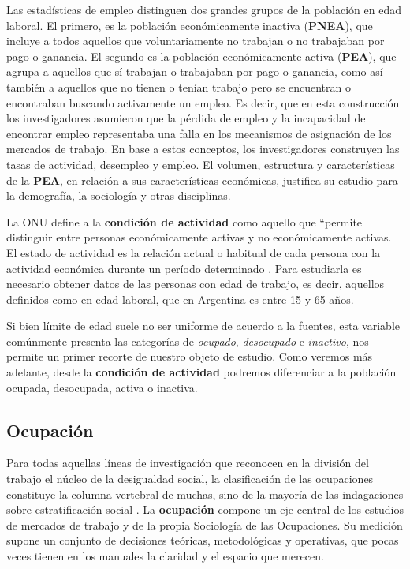 \documentclass[
]{book}
\begin{document}
Las estadísticas de empleo distinguen dos grandes grupos de la población en edad laboral. El primero, es la población económicamente inactiva (\textbf{PNEA}), que incluye a todos aquellos que voluntariamente no trabajan o no trabajaban por pago o ganancia. El segundo es la población económicamente activa (\textbf{PEA}), que agrupa a aquellos que sí trabajan o trabajaban por pago o ganancia, como así también a aquellos que no tienen o tenían trabajo pero se encuentran o encontraban buscando activamente un empleo. Es decir, que en esta construcción los investigadores asumieron que la pérdida de empleo y la incapacidad de encontrar empleo representaba una falla en los mecanismos de asignación de los mercados de trabajo. En base a estos conceptos, los investigadores construyen las tasas de actividad, desempleo y empleo. El volumen, estructura y características de la \textbf{PEA}, en relación a sus características económicas, justifica su estudio para la demografía, la sociología y otras disciplinas.

La ONU define a la \textbf{condición de actividad} como aquello que ``permite distinguir entre personas económicamente activas y no económicamente activas. El estado de actividad es la relación actual o habitual de cada persona con la actividad económica durante un período determinado \citep[p.~6]{ONU1997}. Para estudiarla es necesario obtener datos de las personas con edad de trabajo, es decir, aquellos definidos como en edad laboral, que en Argentina es entre 15 y 65 años.

Si bien límite de edad suele no ser uniforme de acuerdo a la fuentes, esta variable comúnmente presenta las categorías de \emph{ocupado}, \emph{desocupado} e \emph{inactivo}, nos permite un primer recorte de nuestro objeto de estudio. Como veremos más adelante, desde la \textbf{condición de actividad} podremos diferenciar a la población ocupada, desocupada, activa o inactiva.

\hypertarget{ocupaciuxf3n}{%
\subsection{Ocupación}\label{ocupaciuxf3n}}

Para todas aquellas líneas de investigación que reconocen en la división del trabajo el núcleo de la desigualdad social, la clasificación de las ocupaciones constituye la columna vertebral de muchas, sino de la mayoría de las indagaciones sobre estratificación social \citep{Crompton2008, Barozet2007}. La \textbf{ocupación} compone un eje central de los estudios de mercados de trabajo y de la propia Sociología de las Ocupaciones. Su medición supone un conjunto de decisiones teóricas, metodológicas y operativas, que pocas veces tienen en los manuales la claridad y el espacio que merecen.
\end{document}
